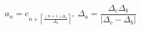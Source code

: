 \documentclass{article}
\begin{document}
\begin{titlepage}


\begin{equation*}
a_{n} = c_{n+ \left\lceil  \frac{(n+1)\Delta _{a}}{\Delta _{b}} \right\rceil },\ \Delta _{a}=\frac{\Delta _{c}\Delta _{b}}{\left\vert \Delta _{c}-\Delta _{b}\right\vert }
\end{equation*}


\end{titlepage}
\end{document}
